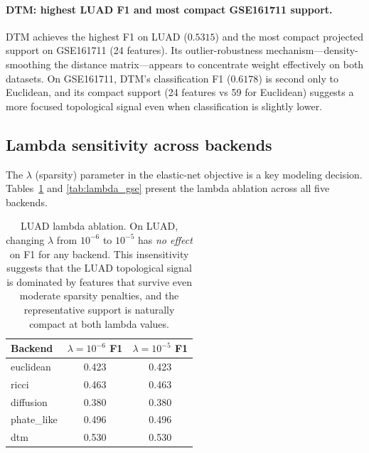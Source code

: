 \documentclass[11pt]{article}
\begin{document}
\paragraph{DTM: highest LUAD F1 and most compact GSE161711 support.}
DTM achieves the highest F1 on LUAD ($0.5315$) and the most compact projected support on GSE161711 (24 features).
Its outlier-robustness mechanism---density-smoothing the distance matrix---appears to concentrate weight effectively on both datasets.
On GSE161711, DTM's classification F1 ($0.6178$) is second only to Euclidean, and its compact support (24 features vs 59 for Euclidean) suggests a more focused topological signal even when classification is slightly lower.

\subsection{Lambda sensitivity across backends}

The $\lambda$ (sparsity) parameter in the elastic-net objective is a key modeling decision.
Tables~\ref{tab:lambda_luad} and \ref{tab:lambda_gse} present the lambda ablation across all five backends.

\begin{table}[h]
\centering
\small
\begin{tabular}{lcc}
\toprule
Backend & $\lambda = 10^{-6}$ F1 & $\lambda = 10^{-5}$ F1 \\
\midrule
euclidean & 0.423 & 0.423 \\
ricci & 0.463 & 0.463 \\
diffusion & 0.380 & 0.380 \\
phate\_like & 0.496 & 0.496 \\
dtm & 0.530 & 0.530 \\
\bottomrule
\end{tabular}
\caption{LUAD lambda ablation.
On LUAD, changing $\lambda$ from $10^{-6}$ to $10^{-5}$ has \emph{no effect} on F1 for any backend.
This insensitivity suggests that the LUAD topological signal is dominated by features that survive even moderate sparsity penalties, and the representative support is naturally compact at both lambda values.}
\label{tab:lambda_luad}
\end{table}
\end{document}
